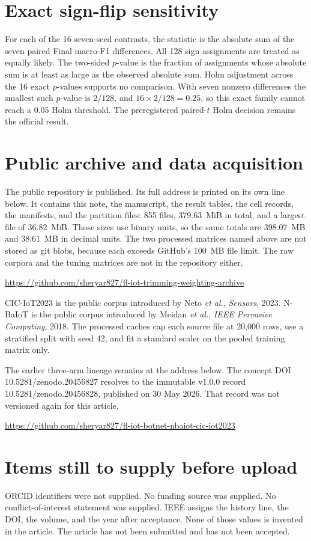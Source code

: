 \documentclass[11pt]{article}
\begin{document}
\section{Exact sign-flip sensitivity}
For each of the 16 seven-seed contrasts, the statistic is the absolute sum of the seven paired Final macro-F1 differences. All 128 sign assignments are treated as equally likely. The two-sided $p$-value is the fraction of assignments whose absolute sum is at least as large as the observed absolute sum. Holm adjustment across the 16 exact $p$-values supports no comparison. With seven nonzero differences the smallest such $p$-value is $2/128$, and $16\times 2/128=0.25$, so this exact family cannot reach a $0.05$ Holm threshold. The preregistered paired-$t$ Holm decision remains the official result.

\section{Public archive and data acquisition}
The public repository is published. Its full address is printed on its own line below. It contains this note, the manuscript, the result tables, the cell records, the manifests, and the partition files: 855 files, 379.63~MiB in total, and a largest file of 36.82~MiB. Those sizes use binary units, so the same totals are 398.07~MB and 38.61~MB in decimal units. The two processed matrices named above are not stored as git blobs, because each exceeds GitHub's 100~MB file limit. The raw corpora and the tuning matrices are not in the repository either.

\begin{flushleft}\raggedright
\url{https://github.com/sheryar827/fl-iot-trimming-weighting-archive}
\end{flushleft}

CIC-IoT2023 is the public corpus introduced by Neto \emph{et al.}, \emph{Sensors}, 2023. N-BaIoT is the public corpus introduced by Meidan \emph{et al.}, \emph{IEEE Pervasive Computing}, 2018. The processed caches cap each source file at 20,000 rows, use a stratified split with seed 42, and fit a standard scaler on the pooled training matrix only.

The earlier three-arm lineage remains at the address below. The concept DOI 10.5281/zenodo.20456827 resolves to the immutable v1.0.0 record 10.5281/zenodo.20456828, published on 30 May 2026. That record was not versioned again for this article.

\begin{flushleft}
\url{https://github.com/sheryar827/fl-iot-botnet-nbaiot-cic-iot2023}
\end{flushleft}

\section{Items still to supply before upload}
ORCID identifiers were not supplied. No funding source was supplied. No conflict-of-interest statement was supplied. IEEE assigns the history line, the DOI, the volume, and the year after acceptance. None of those values is invented in the article. The article has not been submitted and has not been accepted.
\end{document}
